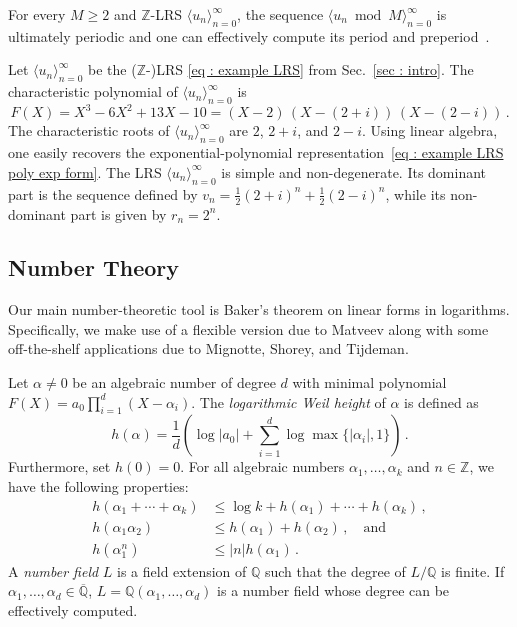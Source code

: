 \documentclass[a4paper,UKenglish,cleveref, autoref, thm-restate]{lipics-v2021}
\newcommand{\alg} {\overline{\mathbb{Q}}}
\begin{document}
For every $M \ge 2$ and $\mathbb{Z}$-LRS $\langle
u_n\rangle_{n=0}^\infty$,
the sequence $\langle u_n\bmod M\rangle_{n=0}^\infty$
is ultimately periodic and one can effectively
compute its period and
preperiod~\cite[Lem.~2.6]{berthe2024decidability}.

\begin{example}\label{example 1}
    Let $\langle u_n\rangle_{n=0}^\infty$ be the ($\mathbb{Z}$-)LRS
    \eqref{eq : example LRS} from Sec.~\ref{sec : intro}.  
    The characteristic polynomial of $\langle u_n \rangle_{n=0}^\infty$ is 
    \begin{equation*}
        F(X) = X^3 - 6X^2 + 13X - 10 = (X-2)\,(X - (2+i))\,(X - (2-i)) \, . 
    \end{equation*}
    The characteristic roots of $\langle u_n\rangle_{n=0}^\infty$ are
    $2$, $2+i$, and $2-i$.
    Using linear algebra, one easily recovers the
    exponential-polynomial representation~\eqref{eq : example LRS poly exp form}. 
    The LRS $\langle u_n\rangle_{n=0}^\infty$ is simple and non-degenerate. 
    Its dominant part is the sequence defined by $v_n =
    \frac{1}{2}(2+i)^n + \frac{1}{2}(2-i)^n$,
    while its non-dominant part is given by $r_n = 2^n$. 
\end{example}
\subsection{Number Theory}\label{sec : number theory}

Our main number-theoretic tool is Baker's theorem on linear forms in logarithms.  Specifically, we make use of a flexible
version due to Matveev along with some off-the-shelf applications due to
Mignotte, Shorey, and Tijdeman.

Let $\alpha \neq 0$ be an algebraic number of degree $d$ with minimal polynomial $F(X) = a_0 \prod_{i=1}^d(X-\alpha_i)$. 
The \emph{logarithmic Weil height} of $\alpha$ is defined as
\begin{equation*}
    h(\alpha) = \frac{1}{d}\left(\log|a_0| + \sum_{i=1}^d \log
      \max\{|\alpha_i|, 1\} \right) \, .
\end{equation*}
Furthermore, set $h(0) = 0$.
For all algebraic numbers $\alpha_1,\dots,\alpha_k$ and $n \in \mathbb{Z}$, we have the following properties:
\begin{align*}
    h(\alpha_1+\cdots+\alpha_k) &\le \log k + h(\alpha_1) + \cdots +
                                  h(\alpha_k) \, ,\\
  h(\alpha_1\alpha_2) &\le h(\alpha_1) + h(\alpha_2) \, , \quad \text{and}\\
    h(\alpha_1^n) &\le |n|h(\alpha_1) \, .
\end{align*}
A \emph{number field} $L$ is a field extension of $\mathbb{Q}$ such that the degree of $L/\mathbb{Q}$ is finite. 
If $\alpha_1,\dots,\alpha_d \in \alg$, $L = \mathbb{Q}(\alpha_1,\dots,\alpha_d)$ is a number field whose degree can be effectively computed.
\end{document}
